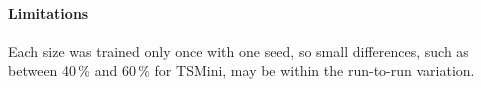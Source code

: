 
\paragraph{Limitations}
Each size was trained only once with one seed, so small differences, such as
between 40\,\% and 60\,\% for TSMini, may be within the run-to-run variation.
